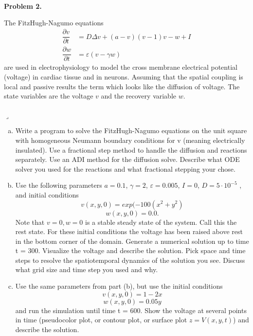 \documentclass[12pt]{article}
\newenvironment{myprob}[1]
    {%
    \noindent{\Huge$\ulcorner$}\textbf{#1.}\begin{em}
    }
    { 
    \end{em} \\ \hphantom{l} \hfill {\Huge$\lrcorner$} }
\begin{document}
\begin{myprob}{Problem 2}
The FitzHugh-Nagumo equations
\begin{align*}
\dfrac{\partial v}{\partial t} &= D \Delta v + (a-v)(v-1)v -w + I \\
\dfrac{\partial w}{\partial t} &= \varepsilon(v-\gamma w)
\end{align*}
are used in electrophysiology to model the cross membrane electrical potential (voltage) in cardiac tissue and in neurons. Assuming that the spatial coupling is local and passive results the term which looks like the diffusion of voltage. The state variables are the voltage $v$ and the recovery variable $w$.
\end{myprob}
\begin{enumerate}[(a)]
\item Write a program to solve the FitzHugh-Nagumo equations on the unit square with homogeneous Neumann boundary conditions for v (meaning electrically insulated). Use a fractional step method to handle the diffusion and reactions separately. Use an ADI method for the diffusion solve. Describe what ODE solver you used for the reactions and what fractional stepping your chose.

\item Use the following parameters $a = 0.1$, $\gamma = 2$, $\varepsilon = 0.005$, $I = 0$, $D = 5 \cdot 10^{-5}$ , and initial conditions 
$$v(x, y, 0) = exp(-100(x^2 + y^2)$$
$$w(x, y, 0) = 0.0.$$
Note that $v = 0, w = 0$ is a stable steady state of the system. Call this the rest state. For these initial conditions the voltage has been raised above rest in the bottom corner of the domain. Generate a numerical solution up to time t = 300. Visualize the voltage and describe the solution. Pick space and time steps to resolve the spatiotemporal dynamics of the solution you see. Discuss what grid size and time step you used and why.

\item  Use the same parameters from part (b), but use the initial conditions
$$v(x,y,0) = 1-2x$$
$$w(x,y,0) = 0.05y$$
and run the simulation until time t = 600. Show the voltage at several points in time (pseudocolor plot, or contour plot, or surface plot $z = V (x, y, t)$) and describe the solution.
\end{enumerate}
\end{document}

